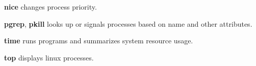 \begin{enumx}
	\item [\cmd] \textbf{nice} changes process priority.
\end{enumx}

\begin{enumx}
	\item [\cmd] \textbf{pgrep}, \textbf{pkill} looks up or signals 
processes based on name and other attributes.
\end{enumx}

\begin{enumx}
	\item [\cmd] \textbf{time} runs programs and summarizes system resource usage. 
\end{enumx}

\begin{enumx}
	\item [\cmd] \textbf{top} displays linux processes.
\end{enumx}